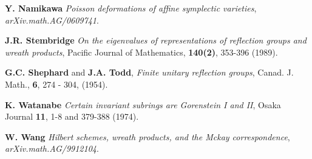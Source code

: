 \documentclass[a4apper,10pt]{amsart}
\theoremstyle{definition}
\numberwithin{thm}{section}
\begin{document}
\begin{thebibliography}{100}
\textbf{Y. Namikawa} \textit{Poisson deformations of affine symplectic varieties}, \textit{arXiv.math.AG/0609741}.


\textbf{J.R. Stembridge} \textit{On the eigenvalues of representations of reflection groups and wreath products}, Pacific Journal of Mathematics, \textbf{140(2)}, 353-396 (1989).


\textbf{G.C. Shephard} and \textbf{J.A. Todd}, \textit{Finite unitary reflection groups}, Canad. J. Math., \textbf{6}, 274 - 304, (1954).

\textbf{K. Watanabe} \textit{Certain invariant subrings are Gorenstein I and II}, Osaka Journal \textbf{11}, 1-8 and 379-388 (1974).

\textbf{W. Wang} \textit{Hilbert schemes, wreath products, and the Mckay correspondence}, \textit{arXiv.math.AG/9912104}.


\end{thebibliography}
\end{document}
